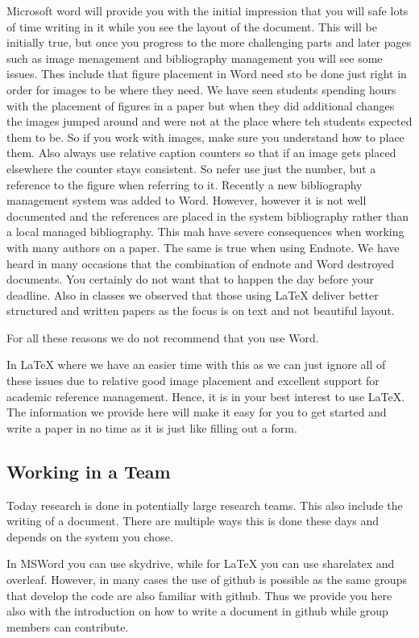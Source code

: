 Microsoft word will provide you with the initial impression that you
will safe lots of time writing in it while you see the layout of the
document. This will be initially true, but once you progress to the
more challenging parts and later pages such as image menagement and
bibliography management you will see some issues. Thes include that
figure placement in Word need sto be done just right in order for images
to be where they need. We have seen students spending hours with the
placement of figures in a paper but when they did additional changes the
images jumped around and were not at the place where teh students
expected them to be. So if you work with images, make sure you
understand how to place them. Also always use relative caption counters
so that if an image gets placed elsewhere the counter stays consistent.
So nefer use just the number, but a reference to the figure when referring
to it. Recently a new bibliography management system was added to Word.
However, however it is not well documented and the references are placed
in the system bibliography rather than a local managed bibliography.
This mah have severe consequences when working with many authors on a
paper. The same is true when using Endnote. We have heard in many
occasions that the combination of endnote and Word destroyed documents.
You certainly do not want that to happen the day before your deadline.
Also in classes we observed that those using LaTeX deliver better
structured and written papers as the focus is on text and not beautiful
layout.

For all these reasons we do not recommend that you use Word.

In LaTeX where we have an easier time with this as we can just ignore
all of these issues due to relative good image placement and excellent
support for academic reference management. Hence, it is in your best
interest to use LaTeX. The information we provide here will make it easy
for you to get started and write a paper in no time as it is just like
filling out a form.

\subsection{Working in a Team}\label{working-in-a-team}

Today research is done in potentially large research teams. This also
include the writing of a document. There are multiple ways this is done
these days and depends on the system you chose.

In MSWord you can use skydrive, while for LaTeX you can use sharelatex
and overleaf. However, in many cases the use of github is possible as
the same groups that develop the code are also familiar with github.
Thus we provide you here also with the introduction on how to write a
document in github while group members can contribute.

